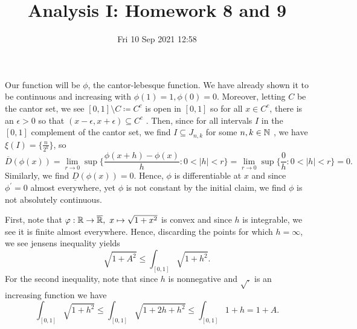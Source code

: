 \documentclass[a4paper]{article}
\title{Analysis I: Homework 8 and 9}
\date{Fri 10 Sep 2021 12:58}
\begin{document}
\maketitle
\begin{problem}[36]
	Our function will be \(\phi\), the cantor-lebesque function. We have already shown it to be continuous and increasing with \(\phi\left( 1 \right) = 1, \phi\left( 0 \right) = 0\). Moreover, letting \(C\) be the cantor set, we see \(\left[ 0, 1 \right] \setminus C \coloneqq C ^{c}\) is open in \(\left[ 0, 1 \right] \) so for all \(x \in C ^{c} \), there is an \(\epsilon > 0\) so that \(\left( x-\epsilon, x+\epsilon \right) \subseteq C ^{c}\) . Then, since for all intervals \(I \)  in the \(\left[ 0, 1 \right] \) complement of the cantor set, we find  \(I \subseteq J_{n, k}\) for some \(n, k \in \mathbb{N}\)  , we have \(\xi(I) = \{\frac{n}{2^{k}}\} \), so \[\overline{D}\left( \phi\left( x \right)  \right)  = \lim_{r \to 0}\sup \{ \frac{ \phi\left( x+h \right) -  \phi\left( x \right) }{h} : 0 < \left| h \right|  < r   \} = \lim_{r \to 0}\sup \{ \frac{0}{h} : 0 < \left| h \right|  <  r\} = 0  .\] Similarly, we find \( \underline{D}  \left( \phi\left( x \right)  \right) = 0\). Hence, \( \phi\) is differentiable at \(x\) and since \( \phi^{\prime} = 0\) almost everywhere, yet \( \phi\) is not constant by the initial claim, we find \( \phi\) is not absolutely continuous.
\end{problem}
\newpage
\begin{problem}[38]
	First, note that \(\varphi: \mathbb{R} \to \overline{\mathbb{R}}, \ x\mapsto \sqrt{1 + x^2} \) is convex and since \(h\) is integrable, we see it is finite almost everywhere. Hence, discarding the points for which \(h = \infty\), we see jensens inequality yields \[
	\sqrt{1 + A^2}  \le \int_{\left[ 0, 1 \right] } \sqrt{1 + h^2}
	.\]
	For the second inequality, note that since \(h\) is nonnegative and \(\sqrt{.} \) is an increasing function we have \[
	\int_{\left[ 0, 1 \right] } \sqrt{1 + h^2} \le \int_{\left[ 0, 1 \right] } \sqrt{1 + 2h + h^2} \le \int_{\left[ 0, 1 \right] }1 + h = 1 + A
	.\]
\end{problem}
\newpage
\end{document}
